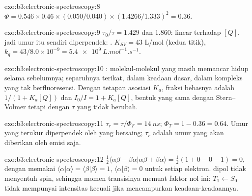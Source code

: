 \begin{solution}{exo:b3:electronic-spectroscopy:8}
$\Phi = 0.546 \times 0.46 \times (0.050/0.040) \times (1.4266/1.333)^2 = 0.36$.
\end{solution}

\begin{solution}{exo:b3:electronic-spectroscopy:9}
$\tau_0/\tau = 1.429$ dan 1.860: linear terhadap $[Q]$, jadi umur itu sendiri
diperpendek: . $K_{SV} = 43$ L/mol (kedua titik),
$k_q = 43/8.0
\times 10^{-9} = \qty{5.4e9}{L.mol^{-1}.s^{-1}}$.
\end{solution}

\begin{solution}{exo:b3:electronic-spectroscopy:10}
: molekul-molekul yang masih memancar hidup selama
sebelumnya; separuhnya terikat, dalam keadaan dasar, dalam kompleks yang tak
berfluoresensi. Dengan tetapan asosiasi $K_a$, fraksi bebasnya adalah
$1/(1 + K_a[Q])$ dan $I_0/I = 1 +
K_a[Q]$, bentuk yang sama dengan Stern--Volmer tetapi dengan $\tau$ yang tidak
berubah.
\end{solution}

\begin{solution}{exo:b3:electronic-spectroscopy:11}
$\tau_r = \tau/\Phi_F = \qty{14}{ns}$; $\Phi_T = 1 - 0.36 = 0.64$. Umur yang
terukur diperpendek oleh  yang bersaing; $\tau_r$ adalah umur
yang akan diberikan oleh emisi saja.
\end{solution}

\begin{solution}{exo:b3:electronic-spectroscopy:12}
$\frac12\langle\alpha\beta - \beta\alpha|\alpha\beta + \beta\alpha\rangle = \frac12(1 + 0 - 0 - 1) = 0$,
dengan memakai $\langle\alpha|\alpha\rangle = \langle\beta|\beta\rangle = 1$,
$\langle\alpha|\beta\rangle = 0$ untuk setiap elektron.  dipol tidak
menyentuh spin, sehingga momen transisinya memuat faktor nol ini:
$T_1 \leftarrow S_0$ tidak mempunyai intensitas kecuali jika  mencampurkan keadaan-keadaannya.
\end{solution}

